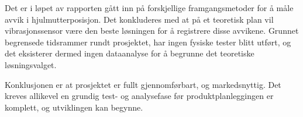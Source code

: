 Det er i løpet av rapporten gått inn på forskjellige framgangsmetoder for å 
måle avvik i hjulmutterposisjon. Det konkluderes med at på et teoretisk plan 
vil vibrasjonssensor være den beste løsningen for å registrere disse avvikene.
Grunnet begrensede tidsrammer rundt prosjektet, har ingen fysiske tester blitt 
utført, og det eksisterer dermed ingen dataanalyse for å begrunne det teoretiske 
løsningsvalget.

Konklusjonen er at prosjektet er fullt gjennomførbart, og markedsnyttig.
Det kreves allikevel en grundig test- og analysefase før produktplanleggingen 
er komplett, og utviklingen kan begynne.